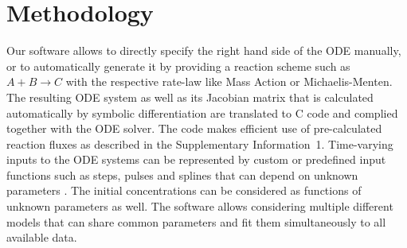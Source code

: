 \documentclass{bioinfo}
\begin{document}
\section{Methodology}
Our software allows to directly specify the right hand side of the ODE manually, or to automatically generate it by  providing a reaction scheme such as $A + B \rightarrow C$ with the respective rate-law like Mass Action or Michaelis-Menten. 
The resulting ODE system as well as its Jacobian matrix that is calculated automatically by symbolic differentiation are translated to C code and complied together with the ODE solver. %
The code makes efficient use of pre-calculated reaction fluxes as described in the Supplementary Information~1. 
Time-varying inputs to the ODE systems can be represented by custom or predefined input functions such as steps, pulses and splines that can depend on unknown parameters \citep{Schelker:2012uq}. 
The initial concentrations %
can be considered as functions %
of unknown parameters as well. 
The software allows considering multiple different models that can share common parameters and fit them simultaneously to all available data. 
\end{document}
